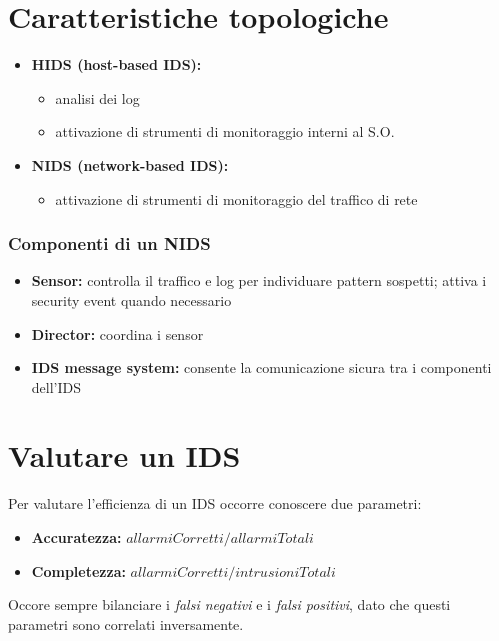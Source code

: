 \section{Caratteristiche topologiche}

\begin{itemize}
    \item \textbf{HIDS (host-based IDS):}
    \begin{itemize}
        \item analisi dei log 
        \item attivazione di strumenti di monitoraggio interni al S.O.
    \end{itemize}
    \item \textbf{NIDS (network-based IDS):}
    \begin{itemize}
        \item attivazione di strumenti di monitoraggio del traffico di rete 
    \end{itemize}
\end{itemize}

\subsubsection{Componenti di un NIDS}
\begin{itemize}
    \item \textbf{Sensor:} controlla il traffico e log per individuare pattern sospetti; attiva i 
    security event quando necessario
    \item \textbf{Director:} coordina i sensor 
    \item \textbf{IDS message system:} consente la comunicazione sicura tra i componenti dell'IDS
\end{itemize}



\section{Valutare un IDS}
Per valutare l'efficienza di un IDS occorre conoscere due parametri:
\begin{itemize}
    \item \textbf{Accuratezza:} $allarmi Corretti / allarmi Totali$
    \item \textbf{Completezza:} $allarmi Corretti / intrusioni Totali$
\end{itemize}

\noindent Occore sempre bilanciare i \textit{falsi negativi}
e i \textit{falsi positivi}, dato che questi parametri sono correlati inversamente.












